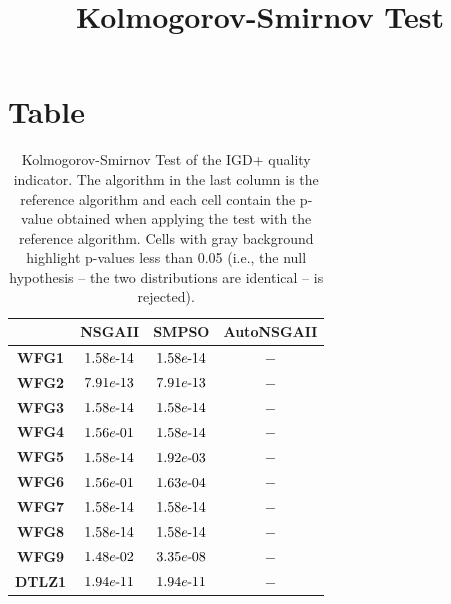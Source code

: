 \documentclass{article}
\title{Kolmogorov-Smirnov Test}
\author{}
\begin{document}
\maketitle
\section{Table}
\begin{table}[!htp]
  \caption{Kolmogorov-Smirnov Test of the IGD+ quality indicator. The algorithm in the last column is the reference algorithm and each cell contain the p-value obtained when applying the test with the reference algorithm. Cells with gray background highlight p-values less than 0.05 (i.e., the null hypothesis -- the two distributions are identical -- is rejected).}
  \label{table:IGD+}
  \centering
  \begin{tiny}
  \begin{tabular}{c|ccc}
      & \textbf{NSGAII} & \textbf{SMPSO} & \textbf{AutoNSGAII} \\\hline
\textbf{WFG1} & $\cellcolor{gray25} 1.58e\makebox[0.1cm]{-}14 $ & $ \cellcolor{gray25} 1.58e\makebox[0.1cm]{-}14 $ & $ -$ \\
\textbf{WFG2} & $\cellcolor{gray25} 7.91e\makebox[0.1cm]{-}13 $ & $ \cellcolor{gray25} 7.91e\makebox[0.1cm]{-}13 $ & $ -$ \\
\textbf{WFG3} & $\cellcolor{gray25} 1.58e\makebox[0.1cm]{-}14 $ & $ \cellcolor{gray25} 1.58e\makebox[0.1cm]{-}14 $ & $ -$ \\
\textbf{WFG4} & $1.56e\makebox[0.1cm]{-}01 $ & $ \cellcolor{gray25} 1.58e\makebox[0.1cm]{-}14 $ & $ -$ \\
\textbf{WFG5} & $\cellcolor{gray25} 1.58e\makebox[0.1cm]{-}14 $ & $ \cellcolor{gray25} 1.92e\makebox[0.1cm]{-}03 $ & $ -$ \\
\textbf{WFG6} & $1.56e\makebox[0.1cm]{-}01 $ & $ \cellcolor{gray25} 1.63e\makebox[0.1cm]{-}04 $ & $ -$ \\
\textbf{WFG7} & $\cellcolor{gray25} 1.58e\makebox[0.1cm]{-}14 $ & $ \cellcolor{gray25} 1.58e\makebox[0.1cm]{-}14 $ & $ -$ \\
\textbf{WFG8} & $\cellcolor{gray25} 1.58e\makebox[0.1cm]{-}14 $ & $ \cellcolor{gray25} 1.58e\makebox[0.1cm]{-}14 $ & $ -$ \\
\textbf{WFG9} & $\cellcolor{gray25} 1.48e\makebox[0.1cm]{-}02 $ & $ \cellcolor{gray25} 3.35e\makebox[0.1cm]{-}08 $ & $ -$ \\
\textbf{DTLZ1} & $\cellcolor{gray25} 1.94e\makebox[0.1cm]{-}11 $ & $ \cellcolor{gray25} 1.94e\makebox[0.1cm]{-}11 $ & $ -$ \\

\end{tabular}
\end{tiny}
\end{table}
\end{document}
